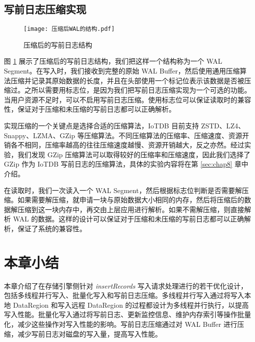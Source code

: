 \subsection{写前日志压缩实现}
\begin{figure}
  \centering
  \texttt{[image: 压缩后WAL的结构.pdf]}
  \caption{压缩后的写前日志结构}
  \label{fig:compressed-wal-structure}
\end{figure}
图 \ref{fig:compressed-wal-structure} 展示了压缩后的写前日志结构，我们把这样一个结构称为一个 WAL Segment。在写入时，我们接收到完整的原始 WAL Buffer，然后使用通用压缩算法压缩并记录其原始数据的长度，并且在头部使用一个标记位表示该数据是否被压缩过。之所以需要用标志位，是因为我们把写前日志压缩实现为一个可选的功能。当用户资源不足时，可以不启用写前日志压缩。使用标志位可以保证读取时的兼容性，保证对于压缩和未压缩的写前日志都可以正确解析。

实现压缩的一个关键点是选择合适的压缩算法，IoTDB 目前支持 ZSTD、LZ4、Snappy、LZMA、GZip 等压缩算法。不同压缩算法的压缩率、压缩速度、资源开销各不相同，压缩率越高的往往压缩速度越慢、资源开销越大，反之亦然。经过实验，我们发现 GZip 压缩算法可以取得较好的压缩率和压缩速度，因此我们选择了 GZip 作为 IoTDB 写前日志的压缩算法，具体的实验内容将在第 \ref{sec:chap8} 章中介绍。

在读取时，我们一次读入一个 WAL Segment，然后根据标志位判断是否需要解压缩。如果需要解压缩，就申请一块与原始数据大小相同的内存，然后将压缩后的数据解压缩到这一块内存中，再交由上层应用进行解析。如果不需解压缩，则直接解析 WAL 的数据。这样的设计可以保证对于压缩和未压缩的写前日志都可以正确解析，保证了系统的兼容性。
\section{本章小结}
本章介绍了在存储引擎侧针对 \emph{insertRecords} 写入请求处理进行的若干优化设计，包括多线程并行写入、批量化写入和写前日志压缩。多线程并行写入通过将写入本地 DataRegion 和写入远程 DataRegion 的过程都设计为多线程并行执行，以提高写入性能。批量化写入通过将写前日志、更新监控信息、维护内存索引等操作批量化，减少这些操作对写入性能的影响。写前日志压缩通过对 WAL Buffer 进行压缩，减少写前日志对磁盘的写入量，提高写入性能。